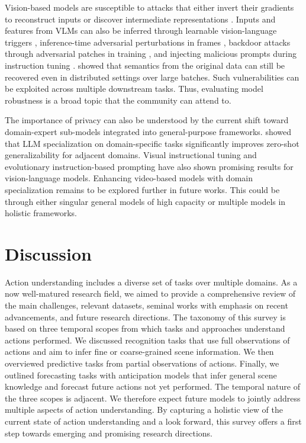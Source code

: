 Vision-based models are susceptible to attacks that either invert their gradients to reconstruct inputs \citep{hatamizadeh2022gradvit} or discover intermediate representations \citep{fang2023gifd}. Inputs and features from VLMs can also be inferred through learnable vision-language triggers \citep{bai2024badclip}, inference-time adversarial perturbations in frames \citep{li2024fmm}, backdoor attacks through adversarial patches in training \citep{carlini2022poisoning}, and injecting malicious prompts during instruction tuning \citep{liang2024vl}. \citet{kariyappa2023cocktail} showed that semantics from the original data can still be recovered even in distributed settings over large batches. Such vulnerabilities can be exploited across multiple downstream tasks. Thus, evaluating model robustness is a broad topic that the community can attend to.

The importance of privacy can also be understood by the current shift toward domain-expert sub-models integrated into general-purpose frameworks. \citet{shen2024tag} showed that LLM specialization on domain-specific tasks significantly improves zero-shot generalizability for adjacent domains. Visual instructional tuning \citep{bai2024generalist} and evolutionary instruction-based prompting \citep{luo2024mmevol} have also shown promising results for vision-language models. Enhancing video-based models with domain specialization remains to be explored further in future works. This could be through either singular general models of high capacity or multiple models in holistic frameworks.  




\section{Discussion}
\label{sec:discussion}

Action understanding includes a diverse set of tasks over multiple domains. As a now well-matured research field, we aimed to provide a comprehensive review of the main challenges, relevant datasets, seminal works with emphasis on recent advancements, and future research directions. The taxonomy of this survey is based on three temporal scopes from which tasks and approaches understand actions performed. We discussed recognition tasks that use full observations of actions and aim to infer fine or coarse-grained scene information. We then overviewed predictive tasks from partial observations of actions. Finally, we outlined forecasting tasks with anticipation models that infer general scene knowledge and forecast future actions not yet performed. The temporal nature of the three scopes is adjacent. We therefore expect future models to jointly address multiple aspects of action understanding. By capturing a holistic view of the current state of action understanding and a look forward, this survey offers a first step towards emerging and promising research directions.  